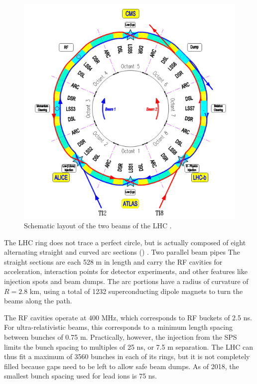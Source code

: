\begin{figure}[t]
\includegraphics{LHC_schematic.png}
\caption{Schematic layout of the two beams of the LHC \cite{Bruning:2004ej}.}
\label{fig:lhc_schematic}
\end{figure}

The LHC ring does not trace a perfect circle, but is actually composed of eight alternating straight and curved arc sections () \cite{Bruning:2004ej}.
Two parallel beam pipes 
The straight sections are each 528 m in length and carry the RF cavities for acceleration, interaction points for detector experiments, and other features like injection spots and beam dumps.
The arc portions have a radius of curvature of $R = 2.8$ km, using a total of 1232 superconducting dipole magnets to turn the beams along the path.

The RF cavities operate at 400 MHz, which corresponds to RF buckets of 2.5 ns.
For ultra-relativistic beams, this corresponds to a minimum length spacing between bunches of 0.75 m.
Practically, however, the injection from the SPS limits the bunch spacing to multiples of 25 ns, or 7.5 m separation.
The LHC can thus fit a maximum of 3560 bunches in each of its rings, but it is not completely filled because gaps need to be left to allow safe beam dumps.
As of 2018, the smallest bunch spacing used for lead ions is 75 ns.

